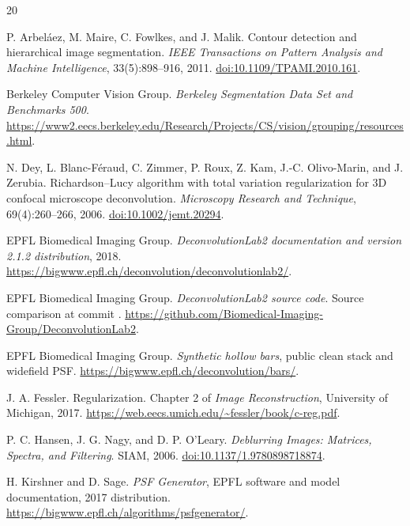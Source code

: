 \begin{thebibliography}{20}
\raggedright
{}
P. Arbel\'aez, M. Maire, C. Fowlkes, and J. Malik.
Contour detection and hierarchical image segmentation.
\emph{IEEE Transactions on Pattern Analysis and Machine Intelligence}, 33(5):898--916, 2011.
\href{https://doi.org/10.1109/TPAMI.2010.161}{doi:10.1109/TPAMI.2010.161}.

Berkeley Computer Vision Group.
\emph{Berkeley Segmentation Data Set and Benchmarks 500}.
\url{https://www2.eecs.berkeley.edu/Research/Projects/CS/vision/grouping/resources.html}.

N. Dey, L. Blanc-F\'eraud, C. Zimmer, P. Roux, Z. Kam, J.-C. Olivo-Marin, and J. Zerubia.
Richardson--Lucy algorithm with total variation regularization for 3D confocal microscope deconvolution.
\emph{Microscopy Research and Technique}, 69(4):260--266, 2006.
\href{https://doi.org/10.1002/jemt.20294}{doi:10.1002/jemt.20294}.

EPFL Biomedical Imaging Group.
\emph{DeconvolutionLab2 documentation and version 2.1.2 distribution}, 2018.
\url{https://bigwww.epfl.ch/deconvolution/deconvolutionlab2/}.

EPFL Biomedical Imaging Group.
\emph{DeconvolutionLab2 source code}.
Source comparison at commit .
\url{https://github.com/Biomedical-Imaging-Group/DeconvolutionLab2}.

EPFL Biomedical Imaging Group.
\emph{Synthetic hollow bars}, public clean stack and widefield PSF.
\url{https://bigwww.epfl.ch/deconvolution/bars/}.

J. A. Fessler.
Regularization.
Chapter 2 of \emph{Image Reconstruction}, University of Michigan, 2017.
\url{https://web.eecs.umich.edu/~fessler/book/c-reg.pdf}.

P. C. Hansen, J. G. Nagy, and D. P. O'Leary.
\emph{Deblurring Images: Matrices, Spectra, and Filtering}.
SIAM, 2006.
\href{https://doi.org/10.1137/1.9780898718874}{doi:10.1137/1.9780898718874}.

H. Kirshner and D. Sage.
\emph{PSF Generator}, EPFL software and model documentation, 2017 distribution.
\url{https://bigwww.epfl.ch/algorithms/psfgenerator/}.


\end{thebibliography}
